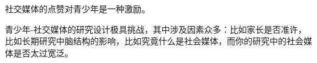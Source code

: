 社交媒体的点赞对青少年是一种激励。

青少年-社交媒体的研究设计极具挑战，其中涉及因素众多：比如家长是否准许，比如长期研究中脑结构的影响，比如究竟什么是社会媒体，而你的研究中的社会媒体是否太过宽泛。


